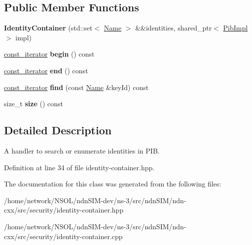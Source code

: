 \subsection*{Public Member Functions}
\begin{DoxyCompactItemize}
\item 
{\bfseries Identity\+Container} (std\+::set$<$ \hyperlink{classndn_1_1Name}{Name} $>$ \&\&identities, shared\+\_\+ptr$<$ \hyperlink{classndn_1_1security_1_1PibImpl}{Pib\+Impl} $>$ impl)\hypertarget{classndn_1_1security_1_1IdentityContainer_ac31aecc2f88bdb77c239c24674c5a0b4}{}\label{classndn_1_1security_1_1IdentityContainer_ac31aecc2f88bdb77c239c24674c5a0b4}

\item 
\hyperlink{classndn_1_1security_1_1IdentityContainer_1_1const__iterator}{const\+\_\+iterator} {\bfseries begin} () const\hypertarget{classndn_1_1security_1_1IdentityContainer_a5bb69f613e4dc4a1ed4ce40e4ee29952}{}\label{classndn_1_1security_1_1IdentityContainer_a5bb69f613e4dc4a1ed4ce40e4ee29952}

\item 
\hyperlink{classndn_1_1security_1_1IdentityContainer_1_1const__iterator}{const\+\_\+iterator} {\bfseries end} () const\hypertarget{classndn_1_1security_1_1IdentityContainer_ae4063270981923317d2022f59b162452}{}\label{classndn_1_1security_1_1IdentityContainer_ae4063270981923317d2022f59b162452}

\item 
\hyperlink{classndn_1_1security_1_1IdentityContainer_1_1const__iterator}{const\+\_\+iterator} {\bfseries find} (const \hyperlink{classndn_1_1Name}{Name} \&key\+Id) const\hypertarget{classndn_1_1security_1_1IdentityContainer_ac686b976dd7910f67d50983af821fc84}{}\label{classndn_1_1security_1_1IdentityContainer_ac686b976dd7910f67d50983af821fc84}

\item 
size\+\_\+t {\bfseries size} () const\hypertarget{classndn_1_1security_1_1IdentityContainer_a11a6a8d21405416c129c36774d539e7c}{}\label{classndn_1_1security_1_1IdentityContainer_a11a6a8d21405416c129c36774d539e7c}

\end{DoxyCompactItemize}


\subsection{Detailed Description}
A handler to search or enumerate identities in P\+IB. 

Definition at line 34 of file identity-\/container.\+hpp.



The documentation for this class was generated from the following files\+:\begin{DoxyCompactItemize}
\item 
/home/network/\+N\+S\+O\+L/ndn\+S\+I\+M-\/dev/ns-\/3/src/ndn\+S\+I\+M/ndn-\/cxx/src/security/identity-\/container.\+hpp\item 
/home/network/\+N\+S\+O\+L/ndn\+S\+I\+M-\/dev/ns-\/3/src/ndn\+S\+I\+M/ndn-\/cxx/src/security/identity-\/container.\+cpp\end{DoxyCompactItemize}
